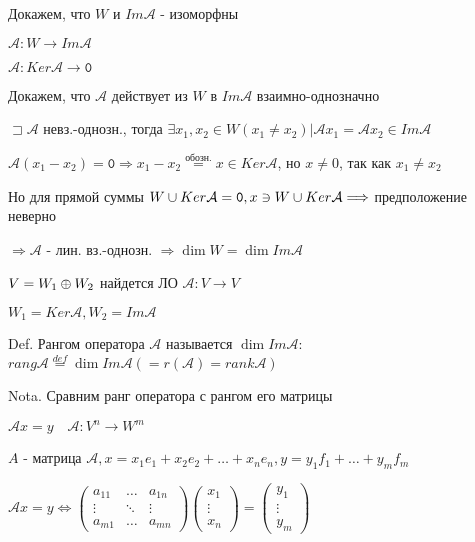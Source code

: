 \documentclass[12pt]{article}
\begin{document}
    Докажем, что $W$ и $Im \mathcal{A}$ - изоморфны

    $\mathcal{A} : W \rightarrow Im \mathcal{A}$

    $\mathcal{A} : Ker \mathcal{A} \rightarrow \texttt{0}$

    Докажем, что $\mathcal{A}$ действует из $W$ в $Im \mathcal{A}$ взаимно-однозначно

    $\sqsupset \mathcal{A}$ невз.-однозн., тогда $\exists x_1, x_2 \in W (x_1 \neq x_2) | \mathcal{A}x_1 = \mathcal{A}x_2 \in Im \mathcal{A}$

    $\mathcal{A}(x_1 - x_2) = \texttt{0} \Longrightarrow x_1 - x_2 \stackrel{\text{обозн.}}{=} x \in Ker \mathcal{A}$, но $x \neq 0$, так как $x_1 \neq x_2$

    Но для прямой суммы $W \cup Ker \mathcal{A} = \texttt{0}, x \ni W \cup Ker \mathcal{A} \Longrightarrow$ предположение неверно

    $\Longrightarrow \mathcal{A}$ - лин. вз.-однозн. $\Longrightarrow \dim W = \dim Im \mathcal{A}$

    $V = W_1 \oplus W_2$ найдется ЛО $\mathcal{A} : V \rightarrow V$

    $W_1 = Ker \mathcal{A}, W_2 = Im \mathcal{A}$

    Def. Рангом оператора $\mathcal{A}$ называется $\dim Im \mathcal{A}$: $rang \mathcal{A} \stackrel{def}{=} \dim Im \mathcal{A} (= r(\mathcal{A}) = rank \mathcal{A})$

    Nota. Сравним ранг оператора с рангом его матрицы

    $\mathcal{A} x = y \quad \mathcal{A} : V^n \rightarrow W^m$

    $A$ - матрица $\mathcal{A}, x = x_1 e_1 + x_2 e_2 + \dots + x_n e_n, y = y_1 f_1 + \dots + y_m f_m$

    $\mathcal{A}x = y \Longleftrightarrow \begin{pmatrix}
         a_{11} & \dots & a_{1n} \\
         \vdots & \ddots & \vdots \\
         a_{m1} & \dots & a_{mn}
    \end{pmatrix} \begin{pmatrix}
         x_1 \\
         \vdots \\
         x_n
    \end{pmatrix} = \begin{pmatrix}
         y_1 \\
         \vdots \\
         y_m
    \end{pmatrix}$
\end{document}
